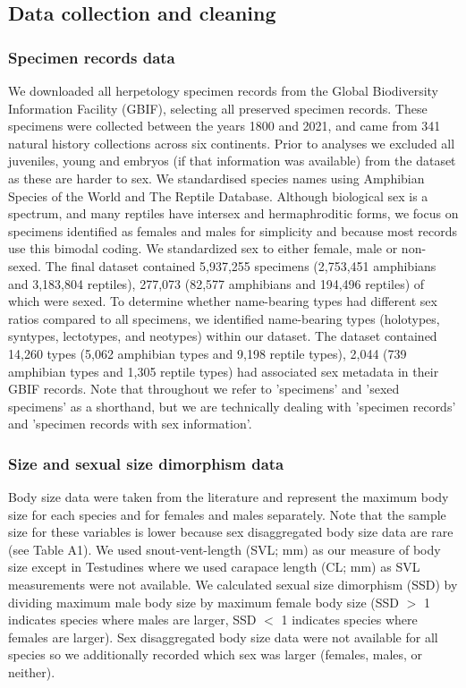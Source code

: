 \documentclass[a4paper, 12pt]{article}
\begin{document}
\subsection{Data collection and cleaning}

\subsubsection{Specimen records data}
We downloaded all herpetology specimen records from the Global Biodiversity Information Facility (GBIF\cite{gbif-amphibians,gbif-reptiles}), selecting all preserved specimen records. 
These specimens were collected between the years 1800 and 2021, and came from 341 natural history collections across six continents. 
Prior to analyses we excluded all juveniles, young and embryos (if that information was available) from the dataset as these are harder to sex. 
We standardised species names using Amphibian Species of the World\cite{frost2021} and The Reptile Database\cite{uetz2021}. 
Although biological sex is a spectrum\cite{sciam2017}, and many reptiles have intersex and hermaphroditic forms\cite{stock2021brief}, we focus on specimens identified as females and males for simplicity and because most records use this bimodal coding. 
We standardized sex to either female, male or non-sexed. 
The final dataset contained 5,937,255 specimens (2,753,451 amphibians and 3,183,804 reptiles), 277,073 (82,577 amphibians and 194,496 reptiles) of which were sexed. 
To determine whether name-bearing types had different sex ratios compared to all specimens, we identified name-bearing types (holotypes, syntypes, lectotypes, and neotypes\cite{schuchert1897type}) within our dataset.
The dataset contained 14,260 types (5,062 amphibian types and 9,198 reptile types), 2,044 (739 amphibian types and 1,305 reptile types) had associated sex metadata in their GBIF records.
Note that throughout we refer to 'specimens' and 'sexed specimens' as a shorthand, but we are technically dealing with 'specimen records' and 'specimen records with sex information'. 

\subsubsection{Size and sexual size dimorphism data}
Body size data were taken from the literature and represent the maximum body size for each species and for females and males separately\cite{herp-data}. 
Note that the sample size for these variables is lower because sex disaggregated body size data are rare (see Table A1).
We used snout-vent-length (SVL; mm) as our measure of body size except in Testudines where we used carapace length (CL; mm) as SVL measurements were not available.
We calculated sexual size dimorphism (SSD) by dividing maximum male body size by maximum female body size (SSD $>$ 1 indicates species where males are larger, SSD $<$ 1 indicates species where females are larger). 
Sex disaggregated body size data were not available for all species so we additionally recorded which sex was larger (females, males, or neither). 
 
\end{document}
